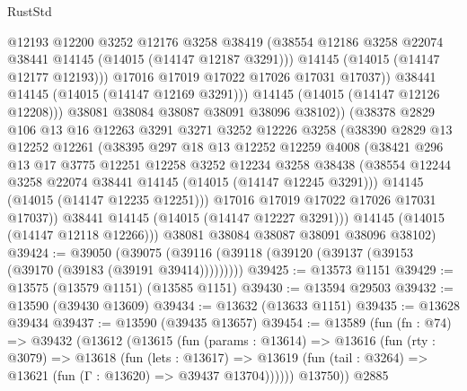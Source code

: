 \begin{lexlean}{RustStd}
\begin{coremodule}
                      @12193
                      @12200
                      @3252
                      @12176
                      @3258
                      @38419
                      (@38554 @12186 @3258 @22074 @38441 @14145 (@14015 (@14147 @12187 @3291)))
                      @14145
                      (@14015 (@14147 @12177 @12193)))
                    @17016
                    @17019
                    @17022
                    @17026
                    @17031
                    @17037))
                @38441
                @14145
                (@14015 (@14147 @12169 @3291)))
              @14145
              (@14015 (@14147 @12126 @12208)))
            @38081
            @38084
            @38087
            @38091
            @38096
            @38102))
        (@38378
          @2829
          @106
          @13
          @16
          @12263
          @3291
          @3271
          @3252
          @12226
          @3258
          (@38390
            @2829
            @13
            @12252
            @12261
            (@38395
              @297
              @18
              @13
              @12252
              @12259
              @4008
              (@38421
                @296
                @13
                @17
                @3775
                @12251
                @12258
                @3252
                @12234
                @3258
                @38438
                (@38554 @12244 @3258 @22074 @38441 @14145 (@14015 (@14147 @12245 @3291)))
                @14145
                (@14015 (@14147 @12235 @12251)))
              @17016
              @17019
              @17022
              @17026
              @17031
              @17037))
          @38441
          @14145
          (@14015 (@14147 @12227 @3291)))
        @14145
        (@14015 (@14147 @12118 @12266)))
      @38081
      @38084
      @38087
      @38091
      @38096
      @38102)
@39424 := @39050
    (@39075 (@39116 (@39118 (@39120 (@39137 (@39153 (@39170 (@39183 (@39191 @39414)))))))))
@39425 := @13573 @1151
@39429 := @13575 (@13579 @1151) (@13585 @1151)
@39430 := @13594 @29503
@39432 := @13590 (@39430 @13609)
@39434 := @13632 (@13633 @1151)
@39435 := @13628 @39434
@39437 := @13590 (@39435 @13657)
@39454 := @13589
    (fun (fn : @74) =>
    @39432
      (@13612
        (@13615
          (fun (params : @13614) =>
          @13616
            (fun (rty : @3079) =>
            @13618
              (fun (lets : @13617) =>
              @13619 (fun (tail : @3264) => @13621 (fun (Γ : @13620) => @39437 @13704))))))
        @13750))
    @2885

\end{coremodule}
\end{lexlean}
